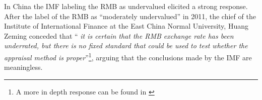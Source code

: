 In China the IMF labeling the RMB as undervalued elicited a strong 
response. After the label of the RMB as ``moderately undervalued'' in 
2011, the chief of the Institute of International Finance at the East 
China Normal University, Huang Zeming conceded that ``\textit{ it is 
	certain that the RMB exchange rate has been underrated, but there is 
	no fixed standard that could be used to test whether the appraisal 
method is proper}''\footnote{A more in depth response can be found in 
\cite{ChinaDaily11}}, arguing that the conclusions made by the IMF are 
meaningless.







